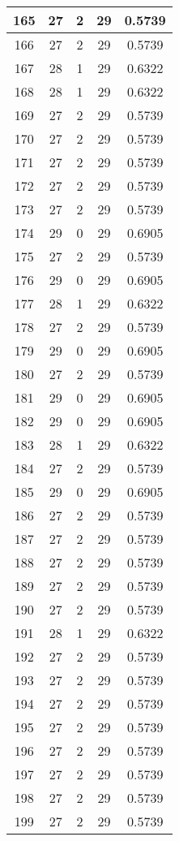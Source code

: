 \documentclass[letterpaper, 12pt]{article}
\begin{document}
\begin{longtable}{|c|c|c|c|c|}
\hline
165 & 27 & 2 & 29 & 0.5739 \\
\hline
166 & 27 & 2 & 29 & 0.5739 \\
\hline
167 & 28 & 1 & 29 & 0.6322 \\
\hline
168 & 28 & 1 & 29 & 0.6322 \\
\hline
169 & 27 & 2 & 29 & 0.5739 \\
\hline
170 & 27 & 2 & 29 & 0.5739 \\
\hline
171 & 27 & 2 & 29 & 0.5739 \\
\hline
172 & 27 & 2 & 29 & 0.5739 \\
\hline
173 & 27 & 2 & 29 & 0.5739 \\
\hline
174 & 29 & 0 & 29 & 0.6905 \\
\hline
175 & 27 & 2 & 29 & 0.5739 \\
\hline
176 & 29 & 0 & 29 & 0.6905 \\
\hline
177 & 28 & 1 & 29 & 0.6322 \\
\hline
178 & 27 & 2 & 29 & 0.5739 \\
\hline
179 & 29 & 0 & 29 & 0.6905 \\
\hline
180 & 27 & 2 & 29 & 0.5739 \\
\hline
181 & 29 & 0 & 29 & 0.6905 \\
\hline
182 & 29 & 0 & 29 & 0.6905 \\
\hline
183 & 28 & 1 & 29 & 0.6322 \\
\hline
184 & 27 & 2 & 29 & 0.5739 \\
\hline
185 & 29 & 0 & 29 & 0.6905 \\
\hline
186 & 27 & 2 & 29 & 0.5739 \\
\hline
187 & 27 & 2 & 29 & 0.5739 \\
\hline
188 & 27 & 2 & 29 & 0.5739 \\
\hline
189 & 27 & 2 & 29 & 0.5739 \\
\hline
190 & 27 & 2 & 29 & 0.5739 \\
\hline
191 & 28 & 1 & 29 & 0.6322 \\
\hline
192 & 27 & 2 & 29 & 0.5739 \\
\hline
193 & 27 & 2 & 29 & 0.5739 \\
\hline
194 & 27 & 2 & 29 & 0.5739 \\
\hline
195 & 27 & 2 & 29 & 0.5739 \\
\hline
196 & 27 & 2 & 29 & 0.5739 \\
\hline
197 & 27 & 2 & 29 & 0.5739 \\
\hline
198 & 27 & 2 & 29 & 0.5739 \\
\hline
199 & 27 & 2 & 29 & 0.5739 \\
\hline
\end{longtable}
\end{document}
